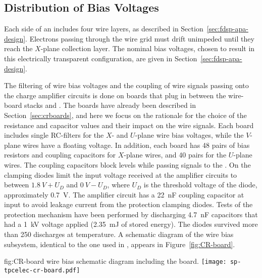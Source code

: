 \subsection{Distribution of Bias Voltages}
\label{sec:fdsp-tpcelec-design-bias}

Each side of an  includes four wire layers, as 
described in Section~\ref{sec:fdsp-apa-design}. Electrons passing 
through the wire grid must drift unimpeded until they reach 
the $X$-plane collection layer. The nominal bias voltages, chosen %
to result in this electrically transparent configuration, %
are given in Section~\ref{sec:fdsp-apa-design}. 

The filtering of wire bias voltages and the  coupling 
of wire signals passing onto the charge amplifier circuits is 
done on  boards that plug in between the  
wire-board stacks and . The  boards
have already been described in Section~\ref{sec:crboards},
and here we focus on the rationale for the choice of the %
resistance and capacitor values and their impact on the
wire signals. Each  board includes single RC-filters 
for the $X$- and $U$-plane wire bias voltages, while the $V$-plane 
wires have a floating voltage. %
In addition, each board 
has \num{48} pairs of bias resistors and  coupling 
capacitors for $X$-plane wires, and \num{40} pairs for the $U$-plane 
wires. The coupling capacitors block  levels while passing  
signals to the . On the  
clamping diodes limit the input voltage received at the amplifier
circuits to between $\SI{1.8}{V}+U_D$ and $\SI{0}{V}-U_D$, where $U_D$
is the threshold voltage of the diode, approximately \SI{0.7}{V}.
The amplifier circuit has a \SI{22}{nF} coupling capacitor at
input to avoid leakage current from the protection clamping diodes.
Tests of the protection mechanism have been performed by discharging
\SI{4.7}{nF} capacitors that had a \SI{1}{kV} voltage applied (\SI{2.35}{mJ} of
stored energy). The diodes survived more than 250 discharges at \lntwo
temperature. A schematic diagram of the   wire bias 
subsystem, identical to the one used in , appears
in Figure~\ref{fig:CR-board}.

\begin{dunefigure}
{fig:CR-board}
{  wire bias schematic diagram including the  board.}
\texttt{[image: sp-tpcelec-cr-board.pdf]}
\end{dunefigure}


